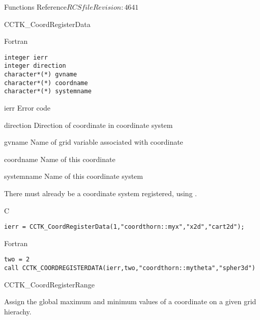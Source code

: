 \begin{cactuspart}{ Functions Reference}{$RCSfile$}{$Revision: 4641 $}
\begin{FunctionDescription}{CCTK\_CoordRegisterData}
\begin{SynopsisSection}
\begin{Synopsis}{Fortran}
\begin{verbatim}
integer ierr
integer direction
character*(*) gvname
character*(*) coordname
character*(*) systemname \end{verbatim}
\end{Synopsis}
\end{SynopsisSection}
\begin{ParameterSection}
\begin{Parameter}{ierr}
Error code
\end{Parameter}
\begin{Parameter}{direction}
Direction of coordinate in coordinate system
\end{Parameter}
\begin{Parameter}{gvname}
Name of grid variable associated with coordinate
\end{Parameter}
\begin{Parameter}{coordname}
Name of this coordinate
\end{Parameter}
\begin{Parameter}{systemname}
Name of this coordinate system
\end{Parameter}
\end{ParameterSection}
\begin{Discussion}
There must already be a coordinate system registered,
using .
\end{Discussion}
\begin{ExampleSection}
\begin{Example}{C}
\begin{verbatim}
ierr = CCTK_CoordRegisterData(1,"coordthorn::myx","x2d","cart2d");
\end{verbatim}
\end{Example}
\begin{Example}{Fortran}
\begin{verbatim}
two = 2
call CCTK_COORDREGISTERDATA(ierr,two,"coordthorn::mytheta","spher3d")
\end{verbatim}
\end{Example}
\end{ExampleSection}
\end{FunctionDescription}


\begin{FunctionDescription}{CCTK\_CoordRegisterRange}%
{Assign the global maximum and minimum
values of a coordinate on a given grid hierachy.

}
\end{FunctionDescription}
\end{cactuspart}
